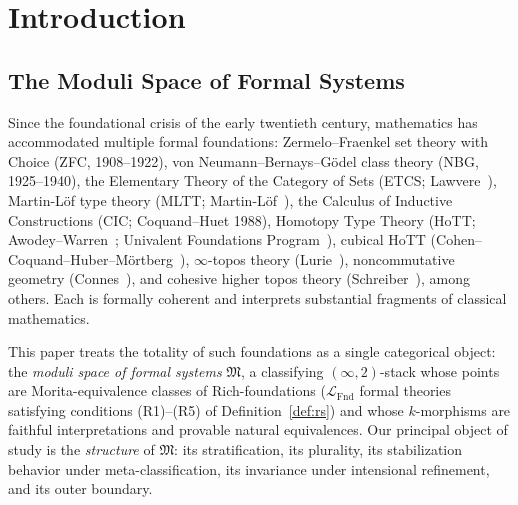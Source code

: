 \documentclass[11pt]{article}
\theoremstyle{plain}
\theoremstyle{definition}
\newcommand{\fM}{\mathfrak{M}}
\newcommand{\LFnd}{\mathcal{L}_{\mathrm{Fnd}}}
\begin{document}
\newpage
\tableofcontents
\newpage

\section{Introduction}

\subsection{The Moduli Space of Formal Systems}

Since the foundational crisis of the early twentieth century, mathematics has accommodated multiple formal foundations: Zermelo--Fraenkel set theory with Choice (ZFC, 1908--1922), von Neumann--Bernays--G\"odel class theory (NBG, 1925--1940), the Elementary Theory of the Category of Sets (ETCS; Lawvere~\cite{Lawvere1964}), Martin-L\"of type theory (MLTT; Martin-L\"of~\cite{MartinLof1984}), the Calculus of Inductive Constructions (CIC; Coquand--Huet 1988), Homotopy Type Theory (HoTT; Awodey--Warren~\cite{AwodeyWarren2009}; Univalent Foundations Program~\cite{HoTTBook2013}), cubical HoTT (Cohen--Coquand--Huber--M\"ortberg~\cite{CohenCoquandHuberMortberg2018}), $\infty$-topos theory (Lurie~\cite{LurieHTT}), noncommutative geometry (Connes~\cite{Connes1994}), and cohesive higher topos theory (Schreiber~\cite{Schreiber2013}), among others. Each is formally coherent and interprets substantial fragments of classical mathematics.

This paper treats the totality of such foundations as a single categorical object: the \emph{moduli space of formal systems} $\fM$, a classifying $(\infty, 2)$-stack whose points are Morita-equivalence classes of Rich-foundations ($\LFnd$ formal theories satisfying conditions (R1)--(R5) of Definition~\ref{def:rs}) and whose $k$-morphisms are faithful interpretations and provable natural equivalences. Our principal object of study is the \emph{structure} of $\fM$: its stratification, its plurality, its stabilization behavior under meta-classification, its invariance under intensional refinement, and its outer boundary.
\end{document}
